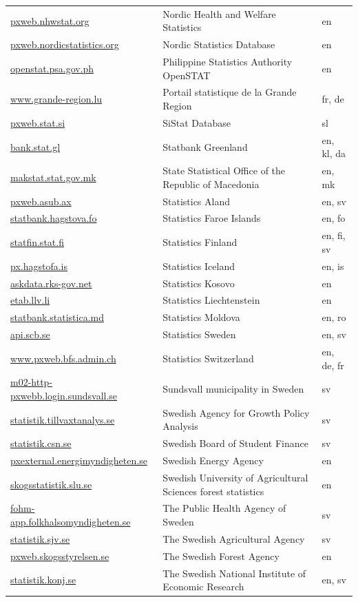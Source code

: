 \documentclass[11pt]{article}
\begin{document}
\begin{table}[!htbp]
\begin{tabular}{@{}L{0.30\textwidth}L{0.46\textwidth}L{0.14\textwidth}@{}}
\url{pxweb.nhwstat.org} & Nordic Health and Welfare Statistics & en\\
\url{pxweb.nordicstatistics.org} & Nordic Statistics Database & en\\
\url{openstat.psa.gov.ph} & Philippine Statistics Authority OpenSTAT & en\\
\url{www.grande-region.lu} & Portail statistique de la Grande Region & fr, de\\
\url{pxweb.stat.si} & SiStat Database & sl\\
\url{bank.stat.gl} & Statbank Greenland & en, kl, da\\
\url{makstat.stat.gov.mk} & State Statistical Office of the Republic of Macedonia & en, mk\\
\url{pxweb.asub.ax} & Statistics Aland & en, sv\\
\url{statbank.hagstova.fo} & Statistics Faroe Islands & en, fo\\
\url{statfin.stat.fi} & Statistics Finland & en, fi, sv\\
\url{px.hagstofa.is} & Statistics Iceland & en, is\\
\url{askdata.rks-gov.net} & Statistics Kosovo & en\\
\url{etab.llv.li} & Statistics Liechtenstein & en\\
\url{statbank.statistica.md} & Statistics Moldova & en, ro\\
\url{api.scb.se} & Statistics Sweden & en, sv\\
\url{www.pxweb.bfs.admin.ch} & Statistics Switzerland & en, de, fr\\
\url{m02-http-pxwebb.login.sundsvall.se} & Sundsvall municipality in Sweden & sv\\
\url{statistik.tillvaxtanalys.se} & Swedish Agency for Growth Policy Analysis & sv\\
\url{statistik.csn.se} & Swedish Board of Student Finance & sv\\
\url{pxexternal.energimyndigheten.se} & Swedish Energy Agency & en\\
\url{skogsstatistik.slu.se} & Swedish University of Agricultural Sciences forest statistics & en\\
\url{fohm-app.folkhalsomyndigheten.se} & The Public Health Agency of Sweden & sv\\
\url{statistik.sjv.se} & The Swedish Agricultural Agency & sv\\
\url{pxweb.skogsstyrelsen.se} & The Swedish Forest Agency & en\\
\url{statistik.konj.se} & The Swedish National Institute of Economic Research & en, sv\\

\end{tabular}
\end{table}
\end{document}

